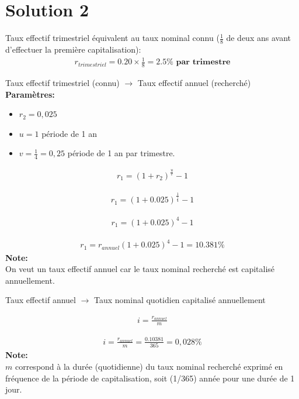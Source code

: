 \documentclass[10pt,a4paper]{article}
\begin{document}
\section*{Solution 2}


Taux effectif trimestriel équivalent au taux nominal connu ($\frac{1}{8}$ de deux ans avant d'effectuer la première capitalisation):
\begin{align*}
r_{trimestriel} = 0.20 \times \frac{1}{8} = 2.5 \% \textbf{ par trimestre}
\end{align*}


Taux effectif trimestriel (connu) $\rightarrow$ Taux effectif annuel (recherché)\\

\textbf{Paramètres:}
\begin{itemize}
\item $r_2 = 0,025$ 
\item $u = 1$ période de 1 an
\item $v = \frac{1}{4} = 0,25$ période de 1 an par trimestre.
\end{itemize}

\begin{align*}
r_1 = (1+r_2)^{\frac{u}{v}}-1
\end{align*}

\begin{align*}
r_1 = (1+0.025)^{\frac{1}{\frac{1}{4}}}-1
\end{align*}

\begin{align*}
r_1 = (1+0.025)^4-1
\end{align*}

\begin{align*}
r_1 =r_{annuel} (1+0.025)^4-1=10.381\%
\end{align*}
\textbf{Note:} \\ On veut un taux effectif annuel car le taux nominal recherché est capitalisé annuellement.

\newpage

Taux effectif annuel $\rightarrow$ Taux nominal quotidien capitalisé annuellement

\begin{align*}
i=\frac{r_{annuel}}{m}
\end{align*}

\begin{align*}
i =\frac{r_{annuel}}{m} = \frac{0.10381}{365} = 0,028\% 
\end{align*}
\textbf{Note:} \\ $m$ correspond à la durée (quotidienne) du taux nominal recherché exprimé en fréquence de la période de capitalisation, soit (1/365) année pour une durée de 1 jour.
\end{document}
